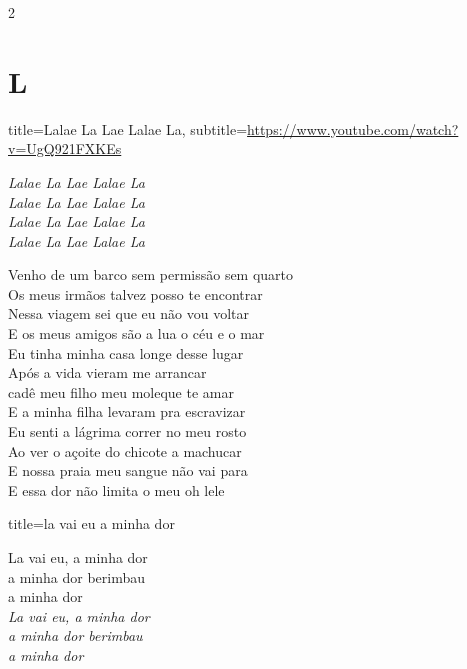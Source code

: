 \documentclass[fontsize=14pt, paper=a4, twoside, DIV=20]{scrreprt} %
\newcommand\chapTOC[1]{
    \chapter*{#1}
    \addcontentsline{toc}{chapter}{#1}
    \markboth{#1}{#1}}
\begin{document}
\begin{multicols*}{2}

\chapTOC{L}

\begin{song}{title={Lalae La Lae Lalae La}, subtitle={\url{https://www.youtube.com/watch?v=UgQ921FXKEs}}}
    \begin{chorus*}

    \textit{Lalae La Lae Lalae La \\
            Lalae La Lae Lalae La \\
            Lalae La Lae Lalae La \\
            Lalae La Lae Lalae La \\}
    \end{chorus*}
     {\small
    \begin{verse*}
            Venho de um barco sem permissão sem quarto \\
            Os meus irmãos talvez posso te encontrar \\
            Nessa viagem sei que eu não vou voltar \\
            E os meus amigos são a lua o céu e o mar \\

            Eu tinha minha casa longe desse lugar\\
            Após a vida vieram me arrancar\\
            cadê meu filho meu moleque te amar\\
            E a minha filha levaram pra escravizar\\

            Eu senti a lágrima correr no meu rosto \\
            Ao ver o açoite do chicote a machucar \\
            E nossa praia meu sangue não vai para \\
            E essa dor não limita o meu oh lele \\
    \end{verse*}}
\end{song}

\begin{song}{title={la vai eu a minha dor}}
    \begin{verse*}
            La vai eu, a minha dor\\
            a minha dor berimbau\\
            a minha dor\\
            \textit{
            La vai eu, a minha dor\\
            a minha dor berimbau\\
            a minha dor\\}
    \end{verse*}
\end{song}


\end{multicols*}
\end{document}
